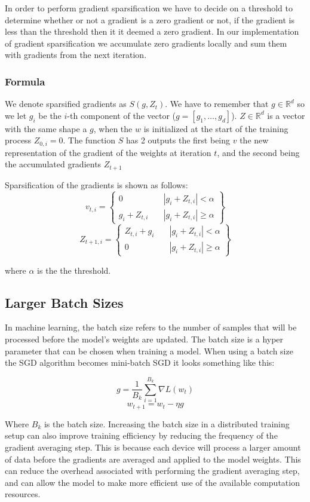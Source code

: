 \documentclass[11pt]{article}
\begin{document}
In order to perform gradient sparsification we have to decide on a threshold to determine whether or not a gradient is a zero gradient or not, if the gradient is less than the threshold then it it deemed a zero gradient. In our implementation of gradient sparsification we accumulate zero gradients locally and sum them with gradients from the next iteration. 

\subsubsection{Formula}
We denote sparsified gradients as $S(g, Z_t)$. We have to remember that $g \in \mathbb{R}^d$ so we let $g_i$ be the $i$-th component of the vector ($g=[g_1,\ldots,g_d]$). $Z \in \mathbb{R}^d$ is a vector with the same shape a $g$, when the $w$ is initialized at the start of the training process $Z_{0,i} = 0$. The function $S$ has 2 outputs the first being $v$ the new representation of the gradient of the weights at iteration $t$, and the second being the accumulated gradients $Z_{t+1}$

Sparsification of the gradients is shown as follows: 
$$
v_{t,i} =
\left\{
	\begin{array}{cc}
		0 & \quad \left| g_i + Z_{t,i}\right| < \alpha \\
		g_i + Z_{t,i} & \quad \left| g_i + Z_{t,i}\right| \geq \alpha
	\end{array}
\right\}
$$
$$
Z_{t+1,i} =
\left\{
	\begin{array}{cc}
		Z_{t,i} + g_i & \quad \left| g_i + Z_{t,i}\right| < \alpha \\
		0	& \quad \left| g_i + Z_{t,i}\right| \geq \alpha
	\end{array}
\right\}
$$

where $\alpha$ is the the threshold.


\subsection{Larger Batch Sizes}
In machine learning, the batch size refers to the number of samples that will be processed before the model's weights are updated. The batch size is a hyper parameter that can be chosen when training a model. When using a batch size the SGD algorithm becomes mini-batch SGD it looks something like this:

$$
g = \frac{1}{B_k} \sum_{i=1}^{B_k} {\nabla} L(w_t)
$$
$$
w_{t+1} = w_t - \eta g
$$ 


Where $B_k$ is the batch size. Increasing the batch size in a distributed training setup can also improve training efficiency by reducing the frequency of the gradient averaging step. This is because each device will process a larger amount of data before the gradients are averaged and applied to the model weights. This can reduce the overhead associated with performing the gradient averaging step, and can allow the model to make more efficient use of the available computation resources.
\end{document}
